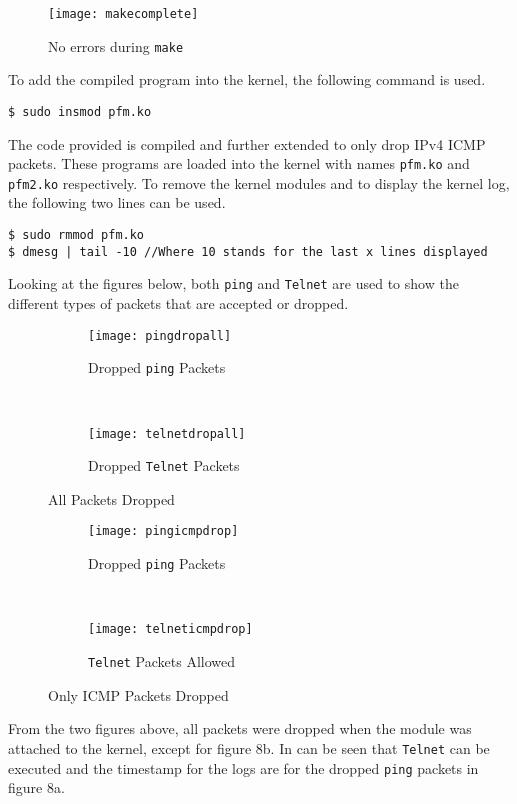 \documentclass[a4paper,12pt]{article}
\begin{document}
\begin{figure}[H]
\centering
\texttt{[image: makecomplete]}
\caption{No errors during \texttt{make}}
\label{fig:makecomplete}
\end{figure}


\noindent To add the compiled program into the kernel, the following command is used.
\begin{verbatim}
$ sudo insmod pfm.ko
\end{verbatim}
\noindent The code provided is compiled and further extended to only drop IPv4 ICMP packets. These programs are loaded into the kernel with names \texttt{pfm.ko} and \texttt{pfm2.ko} respectively. To remove the kernel modules and to display the kernel log, the following two lines can be used.
\begin{verbatim}
$ sudo rmmod pfm.ko
$ dmesg | tail -10 //Where 10 stands for the last x lines displayed
\end{verbatim}
\noindent Looking at the figures below, both \texttt{ping} and \texttt{Telnet} are used to show the different types of packets that are accepted or dropped.
\\
	\begin{figure}[H]
	\centering
		\begin{subfigure}[H]{0.45\textwidth}
			\centering
			\texttt{[image: pingdropall]}
			\caption{Dropped \texttt{ping} Packets}
			\label{fig:pingdropall}
		\end{subfigure}
	~
		\begin{subfigure}{0.45\textwidth}
			\centering
			\texttt{[image: telnetdropall]}
			\caption{Dropped \texttt{Telnet} Packets}
			\label{fig:telnetdropall}
		\end{subfigure}
		\caption{All Packets Dropped}
	\end{figure}
	\begin{figure}[H]
	\centering
		\begin{subfigure}{0.45\textwidth}
			\centering
			\texttt{[image: pingicmpdrop]}
			\caption{Dropped \texttt{ping} Packets}
			\label{fig:icmppingdrop}
		\end{subfigure}
		~
		\begin{subfigure}[H]{0.45\textwidth}
			\centering
			\texttt{[image: telneticmpdrop]}
			\caption{\texttt{Telnet} Packets Allowed}
			\label{fig:telneticmpdrop}
		\end{subfigure}
		\caption{Only ICMP Packets Dropped}
	\end{figure}
\noindent From the two figures above, all packets were dropped when the module was attached to the kernel, except for figure 8b. In can be seen that \texttt{Telnet} can be executed and the timestamp for the logs are for the dropped \texttt{ping} packets in figure 8a.
\end{document}
